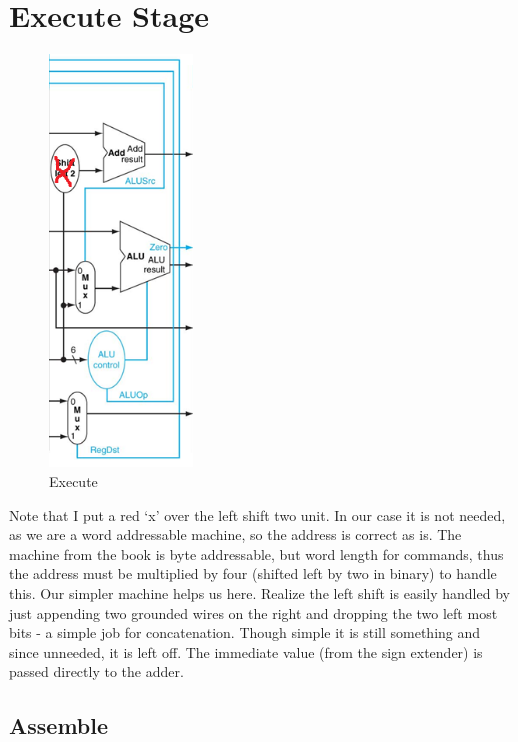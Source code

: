 \chapter{Execute Stage}

\begin{figure}
\caption{Execute}\label{fig:execute}
\begin{center}
\includegraphics[width=1.5in]{../images/pipeline_execute.png}
\end{center}
\end{figure}

\WrapBarrier

Note that I put a red `x' over the left shift two unit.  In our case it is not needed, as we are a word addressable machine, so the address is correct as is.  The machine from the book is byte addressable, but word length for commands, thus the address must be multiplied by four (shifted left by two in binary) to handle this.  Our simpler machine helps us here.  Realize the left shift is easily handled by just appending two grounded wires on the right and dropping the two left most bits - a simple job for concatenation.  Though simple it is still something and since unneeded, it is left off.  The immediate value (from the sign extender) is passed directly to the adder.

\section{Assemble}

